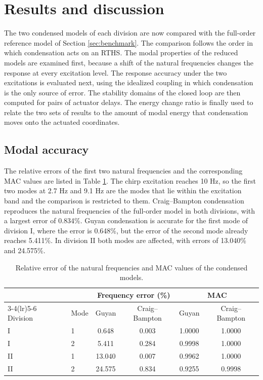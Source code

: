 \documentclass[11pt,a4paper]{article}
\numberwithin{equation}{section}
\begin{document}
\section{Results and discussion} \label{sec5}

The two condensed models of each division are now compared with the full-order reference model of Section \ref{sec:benchmark}. The comparison follows the order in which condensation acts on an RTHS. The modal properties of the reduced models are examined first, because a shift of the natural frequencies changes the response at every excitation level. The response accuracy under the two excitations is evaluated next, using the idealized coupling in which condensation is the only source of error. The stability domains of the closed loop are then computed for pairs of actuator delays. The energy change ratio is finally used to relate the two sets of results to the amount of modal energy that condensation moves onto the actuated coordinates.

\subsection{Modal accuracy}
\label{sec:modal-accuracy}

The relative errors of the first two natural frequencies and the corresponding MAC values are listed in Table \ref{tab:modal}. The chirp excitation reaches 10 Hz, so the first two modes at 2.7 Hz and 9.1 Hz are the modes that lie within the excitation band and the comparison is restricted to them. Craig--Bampton condensation reproduces the natural frequencies of the full-order model in both divisions, with a largest error of 0.834\%. Guyan condensation is accurate for the first mode of division I, where the error is 0.648\%, but the error of the second mode already reaches 5.411\%. In division II both modes are affected, with errors of 13.040\% and 24.575\%.

\begin{table}[htbp]
	\centering
	\caption{Relative error of the natural frequencies and MAC values of the condensed models.}
	\label{tab:modal}
	\begin{tabular}{llcccc}
		\toprule
		& & \multicolumn{2}{c}{Frequency error (\%)} & \multicolumn{2}{c}{MAC}\\
		\cmidrule(lr){3-4}\cmidrule(lr){5-6}
		Division & Mode & Guyan & Craig--Bampton & Guyan & Craig--Bampton\\
		\midrule
		I  & 1 & 0.648  & 0.003 & 1.0000 & 1.0000\\
		I  & 2 & 5.411  & 0.284 & 0.9998 & 1.0000\\
		\midrule
		II & 1 & 13.040 & 0.007 & 0.9962 & 1.0000\\
		II & 2 & 24.575 & 0.834 & 0.9255 & 0.9998\\
		\bottomrule
	\end{tabular}
\end{table}
\end{document}
